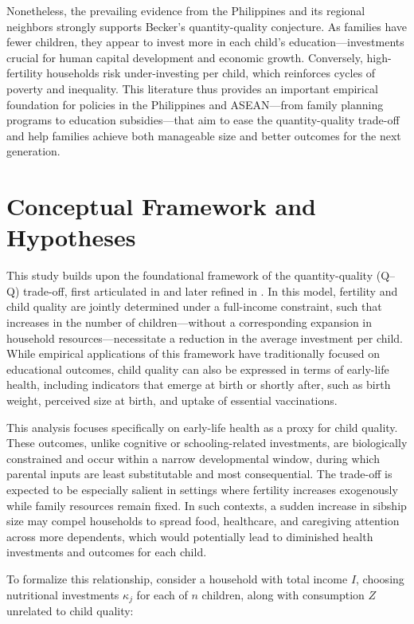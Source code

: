 \documentclass[]{AEA}
\begin{document}
Nonetheless, the prevailing evidence from the Philippines and its
regional neighbors strongly supports Becker's quantity-quality
conjecture. As families have fewer children, they appear to invest more
in each child's education---investments crucial for human capital
development and economic growth. Conversely, high-fertility households
risk under-investing per child, which reinforces cycles of poverty and
inequality. This literature thus provides an important empirical
foundation for policies in the Philippines and ASEAN---from family
planning programs to education subsidies---that aim to ease the
quantity-quality trade-off and help families achieve both manageable
size and better outcomes for the next generation.

\section{Conceptual Framework and Hypotheses}

This study builds upon the foundational framework of the
quantity-quality (Q--Q) trade-off, first articulated in
\citet{becker1960economic} and later refined in
\citet{becker1973interaction}. In this model, fertility and child
quality are jointly determined under a full-income constraint, such that
increases in the number of children---without a corresponding expansion
in household resources---necessitate a reduction in the average
investment per child. While empirical applications of this framework
have traditionally focused on educational outcomes, child quality can
also be expressed in terms of early-life health, including indicators
that emerge at birth or shortly after, such as birth weight, perceived
size at birth, and uptake of essential vaccinations.

This analysis focuses specifically on early-life health as a proxy for
child quality. These outcomes, unlike cognitive or schooling-related
investments, are biologically constrained and occur within a narrow
developmental window, during which parental inputs are least
substitutable and most consequential. The trade-off is expected to be
especially salient in settings where fertility increases exogenously
while family resources remain fixed. In such contexts, a sudden increase
in sibship size may compel households to spread food, healthcare, and
caregiving attention across more dependents, which would potentially
lead to diminished health investments and outcomes for each child.

To formalize this relationship, consider a household with total income
\(I\), choosing nutritional investments \(\kappa_j\) for each of \(n\)
children, along with consumption \(Z\) unrelated to child quality:
\end{document}
